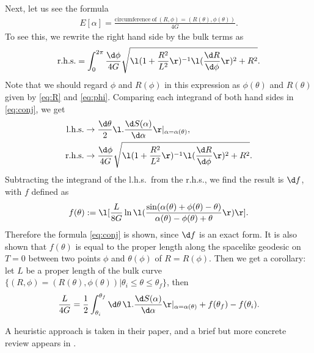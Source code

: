 \documentclass[12pt]{article}
\begin{document}
Next, let us see the formula
\begin{align}
	E[\alpha] = \frac{\mathrm{circumference~of~}(R,\phi) = (R(\theta),\phi(\theta))}{4G}.\label{eq:conj}
\end{align}
To see this, we rewrite the right hand side by the bulk terms as
\begin{align}
	\mathrm{r.h.s.} = \int_0^{2\pi} \frac{\d\phi}{4G}\sqrt{\l(1 + \frac{R^2}{L^2}\r)^{-1}\l(\frac{\d R}{\d \phi}\r)^2 + R^2}.
\end{align}
Note that we should regard $\phi$ and $R(\phi)$ in this expression as $\phi(\theta)$ and $R(\theta)$ given by \eqref{eq:R} 
and \eqref{eq:phi}.
Comparing each integrand of both hand sides in \eqref{eq:conj}, we get
\begin{align}
	\mathrm{l.h.s.} &\rightarrow \frac{\d\theta}{2}\l.\frac{\d S(\alpha)}{\d\alpha}\r|_{\alpha = \alpha(\theta)},\\
	\mathrm{r.h.s.} &\rightarrow \frac{\d\phi}{4G}\sqrt{\l(1 + \frac{R^2}{L^2}\r)^{-1}\l(\frac{\d R}{\d \phi}\r)^2 + R^2}.
\end{align}
Subtracting the integrand of the l.h.s.\ from the r.h.s., we find the result is $\d f$, with $f$ defined as
\begin{align}
	f(\theta) := \l[\frac{L}{8G}\ln\l(\frac{\sin(\alpha(\theta)+\phi(\theta)-\theta)}{\alpha(\theta)-\phi(\theta) + \theta} \r) \r].
\end{align}
Therefore the formula \eqref{eq:conj} is shown, since $\d f$ is an exact form.
It is also shown that $f(\theta)$ is equal to the proper length along the spacelike geodesic on $T=0$ between two points $\phi$ and $\theta(\phi)$ of $R = R(\phi)$.
Then we get a corollary: let $L$ be a proper length of the bulk curve $\{(R,\phi) = (R(\theta),\phi(\theta))|\theta_i\le\theta\le \theta_f\}$, then
\begin{align}
	\frac{L}{4G} = \frac{1}{2}\int_{\theta_i}^{\theta_f}\d\theta\,\l.\frac{\d S(\alpha)}{\d \alpha}\r|_{\alpha = \alpha(\theta)}  + f(\theta_f) - f(\theta_i).
\end{align}

A heuristic approach is taken in their paper, and a brief but more concrete review appears in \cite{Czech:2014ppa}.


































 

\end{document}
